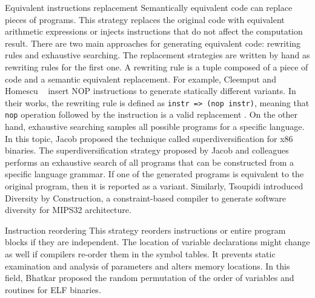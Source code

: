\begin{strategy}{Equivalent instructions replacement}
    \label{strategy:S1}
    \normalfont 
    Semantically equivalent code can replace pieces of programs. This strategy replaces the original code with equivalent arithmetic expressions or injects instructions that do not affect the computation result. There are two main approaches for generating equivalent code: rewriting rules and exhaustive searching. The replacement strategies are written by hand as rewriting rules for the first one. A rewriting rule is a tuple composed of a piece of code and a semantic equivalent replacement. For example, Cleemput \etal \cite{Cleemput2012} and Homescu \etal~\cite{homescu2013profile} insert NOP instructions to generate statically different variants. In their works, the rewriting rule is defined as \texttt{instr => (nop instr)}, meaning that \texttt{nop} operation followed by the instruction is a valid replacement .
    On the other hand, exhaustive searching samples all possible programs for a specific language. In this topic, Jacob \etal \cite{jacob2008superdiversifier} proposed the technique called superdiversification for x86 binaries. The superdiversification strategy proposed by Jacob and colleagues performs an exhaustive search of all programs that can be constructed from a specific language grammar. If one of the generated programs is equivalent to the original program, then it is reported as a variant. Similarly, Tsoupidi \etal \cite{Tsoupidi2020ConstraintBasedSD} introduced Diversity by Construction, a constraint-based compiler to generate software diversity for MIPS32 architecture.  
\end{strategy}


\begin{strategy}{Instruction reordering}
    \label{strategy:S2}
    \normalfont
    This strategy reorders instructions or entire program blocks if they are independent.
    The location of variable declarations might change as well if compilers re-order them in the symbol tables. It prevents static examination and analysis of parameters and alters memory locations. In this field, Bhatkar \etal \cite{bhatkar03, bhatkar2005efficient} proposed the random permutation of the order of variables and routines for ELF binaries.
\end{strategy}

